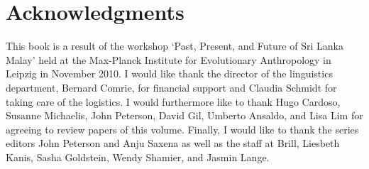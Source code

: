 \section*{Acknowledgments}

This book is a result of the workshop `Past, Present, and Future of Sri Lanka Malay' held at the Max-Planck Institute for Evolutionary Anthropology in Leipzig in November 2010. I would like  thank the director of the linguistics department, Bernard Comrie, for financial support and Claudia Schmidt for taking care of the logistics.
I would furthermore like to thank Hugo Cardoso, Susanne Michaelis, John Peterson, David Gil, Umberto Ansaldo, and Lisa Lim for agreeing to review papers of this volume.
Finally, I would like to thank the series editors John Peterson and Anju Saxena as well as the staff at Brill, 
 Liesbeth Kanis,
 Sasha Goldstein, 
 Wendy Shamier,
and
 Jasmin Lange.